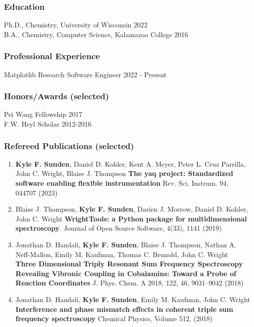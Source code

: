 \documentclass[12pt]{article}
\numberwithin{page}{section}
\begin{document}
\subsubsection*{Education}
Ph.D., Chemistry, University of Wisconsin \hfill 2022\\
B.A., Chemistry, Computer Science, Kalamazoo College \hfill 2016\\

\subsubsection*{Professional Experience}
Matplotlib Research Software Engineer \hfill 2022 - Present\\

\subsubsection*{Honors/Awards (selected)}
Pei Wang Fellowship \hfill 2017\\
F.W. Heyl Scholar \hfill 2012-2016\\

\subsubsection*{Refereed Publications (selected)}

\begin{enumerate}[noitemsep]
  \item \textbf{Kyle F. Sunden}, Daniel D. Kohler, Kent A. Meyer,
    Peter L. Cruz Parrilla, John C. Wright, Blaise J. Thompson
    \textbf{The yaq project: Standardized software enabling flexible instrumentation}
    Rev. Sci. Instrum. 94, 044707 (2023)

  \item Blaise J. Thompson, \textbf{Kyle F. Sunden}, Darien J. Morrow,
    Daniel D. Kohler, John C. Wright
    \textbf{WrightTools: a Python package for multidimensional spectroscopy}.
    Journal of Open Source Software, 4(33), 1141 (2019)

  \item Jonathan D. Handali, \textbf{Kyle F. Sunden}, Blaise J. Thompson,
    Nathan A. Neff-Mallon, Emily M. Kaufman, Thomas C. Brunold, John C. Wright
    \textbf{Three Dimensional Triply Resonant Sum Frequency Spectroscopy Revealing
    Vibronic Coupling in Cobalamins: Toward a Probe of Reaction Coordinates}
    J. Phys. Chem. A 2018, 122, 46, 9031–9042 (2018)

  \item Jonathan D. Handali, \textbf{Kyle F. Sunden}, Emily M. Kaufman, John C. Wright
    \textbf{Interference and phase mismatch effects in coherent triple sum frequency spectroscopy}
    Chemical Physics, Volume 512, (2018)

\end{enumerate}
\end{document}
